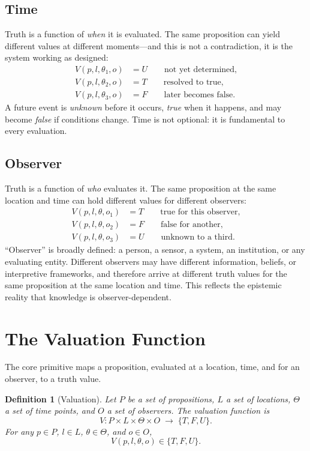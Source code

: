 \documentclass[11pt,a4paper]{article}
\newtheorem{definition}{Definition}
\begin{document}
\subsection{Time}
Truth is a function of \emph{when} it is evaluated. The same proposition can
yield different values at different moments---and this is not a contradiction,
it is the system working as designed:
\begin{align*}
V(p, l, \theta_1, o) &= U \qquad \text{not yet determined,} \\
V(p, l, \theta_2, o) &= T \qquad \text{resolved to true,} \\
V(p, l, \theta_3, o) &= F \qquad \text{later becomes false.}
\end{align*}
A future event is \emph{unknown} before it occurs, \emph{true} when it
happens, and may become \emph{false} if conditions change. Time is not
optional: it is fundamental to every evaluation.

\subsection{Observer}
Truth is a function of \emph{who} evaluates it. The same proposition at the
same location and time can hold different values for different observers:
\begin{align*}
V(p, l, \theta, o_1) &= T \qquad \text{true for this observer,} \\
V(p, l, \theta, o_2) &= F \qquad \text{false for another,} \\
V(p, l, \theta, o_3) &= U \qquad \text{unknown to a third.}
\end{align*}
``Observer'' is broadly defined: a person, a sensor, a system, an institution,
or any evaluating entity. Different observers may have different information,
beliefs, or interpretive frameworks, and therefore arrive at different truth
values for the same proposition at the same location and time. This reflects
the epistemic reality that knowledge is observer-dependent.

\section{The Valuation Function}
The core primitive maps a proposition, evaluated at a location, time, and for
an observer, to a truth value.

\begin{definition}[Valuation]
Let $P$ be a set of propositions, $L$ a set of locations, $\Theta$ a set of
time points, and $O$ a set of observers. The valuation function is
\[
V : P \times L \times \Theta \times O \;\longrightarrow\; \{T, F, U\}.
\]
For any $p \in P$, $l \in L$, $\theta \in \Theta$, and $o \in O$,
\[
V(p, l, \theta, o) \in \{T, F, U\}.
\]
\end{definition}
\end{document}
